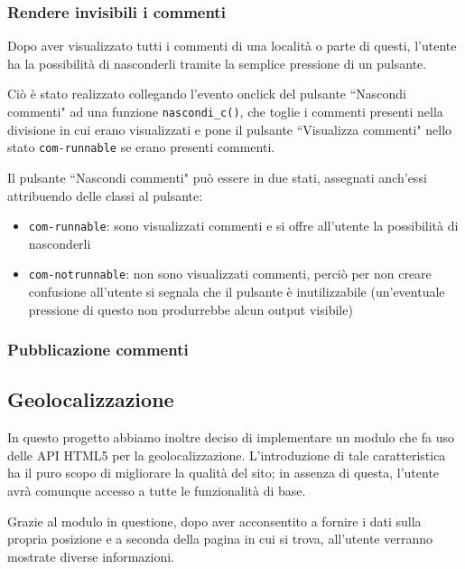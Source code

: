 \subsubsection{Rendere invisibili i commenti}
Dopo aver visualizzato tutti i commenti di una località o parte di questi,
l'utente ha la possibilità di nasconderli tramite la semplice pressione di un
pulsante.

Ciò è stato realizzato collegando l'evento onclick del pulsante
``Nascondi commenti" ad una funzione \texttt{nascondi\_c()}, che toglie i
commenti presenti nella divisione in cui erano visualizzati e pone il pulsante
``Visualizza commenti" nello stato \texttt{com-runnable} se erano presenti
commenti.

Il pulsante ``Nascondi commenti" può essere in due stati, assegnati anch'essi
attribuendo delle classi al pulsante:
\begin{itemize}
\item \texttt{com-runnable}: sono visualizzati commenti e si offre all'utente
la possibilità di nasconderli
\item \texttt{com-notrunnable}: non sono visualizzati commenti, perciò per non
creare confusione all'utente si segnala che il pulsante è inutilizzabile
(un'eventuale pressione di questo non produrrebbe alcun output visibile)
\end{itemize}


\subsubsection{Pubblicazione commenti} %

\subsection{Geolocalizzazione} %
In questo progetto abbiamo inoltre deciso di implementare un modulo che fa uso delle API HTML5 per la geolocalizzazione. L'introduzione di tale caratteristica ha il puro scopo di migliorare la qualità del sito; in assenza di questa, l'utente avrà comunque accesso a tutte le funzionalità di base.
\begin{flushleft}
Grazie al modulo in questione, dopo aver acconsentito a fornire i dati sulla propria posizione e a seconda della pagina in cui si trova, all'utente verranno mostrate diverse informazioni.
\end{flushleft}

